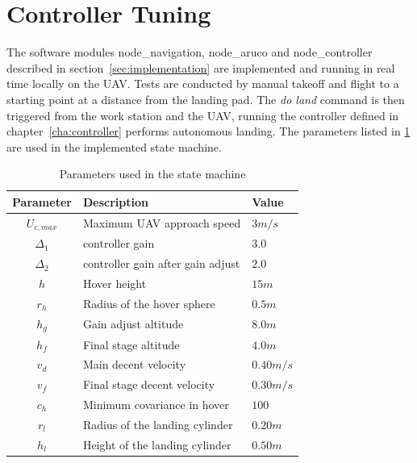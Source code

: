 \section{Controller Tuning} %
\label{sec:controller_tuning}
The software modules node\_navigation, node\_aruco and node\_controller described in section~\ref{sec:implementation} are implemented and running in real time locally on the \gls{UAV}. Tests are conducted by manual takeoff and flight to a starting point at a distance from the landing pad. The \textit{do land} command is then triggered from the work station and the UAV, running the controller defined in chapter~\ref{cha:controller} performs autonomous landing. The parameters listed in \ref{tab:stateMachineParameters} are used in the implemented state machine.
\begin{table}[!htb]
  \centering
  \begin{tabular}{c|l|l}
    \toprule
    \textbf{Parameter}&\textbf{Description}&\textbf{Value}\\
    \hline
    $U_{c,max}$&Maximum UAV approach speed&$3m/s$\\
    $\Delta_1$&controller gain&$3.0$\\
    $\Delta_2$&controller gain after gain adjust&$2.0$\\
    $h$&Hover height&$15m$\\
    $r_h$&Radius of the hover sphere&$0.5m$\\
    $h_g$&Gain adjust altitude&$8.0m$\\
    $h_f$&Final stage altitude&$4.0m$\\
    $v_d$&Main decent velocity&$0.40m/s$\\
    $v_f$&Final stage decent velocity&$0.30m/s$\\
    $c_h$&Minimum covariance in hover&$100$\\
    $r_l$&Radius of the landing cylinder&$0.20m$\\
    $h_l$&Height of the landing cylinder&$0.50m$\\
    \bottomrule
  \end{tabular}
  \caption{Parameters used in the state machine}
  \label{tab:stateMachineParameters}
\end{table}

